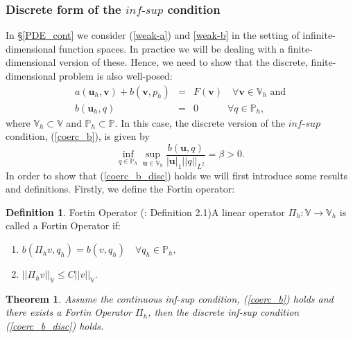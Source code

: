 \documentclass[12pt,a4paper]{article}
\newtheorem{theorem}{Theorem}[section]
\theoremstyle{definition}
\newtheorem{definition}{Definition}[section]
\begin{document}
\subsubsection{Discrete form of the $\textit{inf-sup}$ condition}\label{PDE_disc}
In \S \ref{PDE_cont} we consider (\ref{weak-a}) and \ref{weak-b} in the setting of infinite-dimensional function spaces.  In practice we will be dealing with a finite-dimensional version of these.  Hence, we need to show that the discrete, finite-dimensional problem is also well-posed:
\begin{eqnarray}
		a\left(\textbf{u}_h,\textbf{v}\right) + b\left(\textbf{v},p_h\right) &=& F\left(\textbf{v}\right)\quad \forall 
	\textbf{v} \in \mathbb{V}_h \text{ and} \\
	b\left(\textbf{u}_h,q\right)&=&0 \quad \quad\quad\forall q \in\mathbb{P}_h,
\end{eqnarray}
where $\mathbb{V}_h\subset\mathbb{V}$ and $\mathbb{P}_h\subset\mathbb{P}$.  In this case, the discrete version of the $\textit{inf-sup}$ condition, (\ref{coerc_b}), is given by
\begin{equation}\label{coerc_b_disc}
	\inf_{q\in \mathbb{P}_h}\sup_{\textbf{u}\in \mathbb{V}_h}\frac{b\left(\textbf{u},q\right)}{\left|\textbf{u}\right|_1 \left|\left|q\right|\right|_{L^2}}=\beta>0.
\end{equation}
In order to show that (\ref{coerc_b_disc}) holds we will first introduce some results and definitions. Firstly, we define the Fortin operator:
\theoremstyle{definition}
\begin{definition}{Fortin Operator} (\cite{Chen2016}: Definition 2.1)\label{Fortin_defn}
	A linear operator $\Pi_h: \mathbb{V} \rightarrow \mathbb{V}_h$ is called a Fortin Operator if:
	\begin{enumerate}
	\item$b\left(\Pi_h v, q_h\right)=b\left(v, q_h\right)\quad \forall q_h \in \mathbb{P}_h,$
	\item $\left|\left|\Pi_h v\right|\right|_{\mathbb{V}}\leq C\left|\left|v\right|\right|_\mathbb{V}.$
	\end{enumerate}
\end{definition}
\begin{theorem}\label{theorem_inf_sup_disc}
	Assume the continuous inf-sup condition, (\ref{coerc_b}) holds and there exists a Fortin Operator $\Pi_h$, then the discrete inf-sup condition (\ref{coerc_b_disc}) holds.
\end{theorem}
\end{document}
